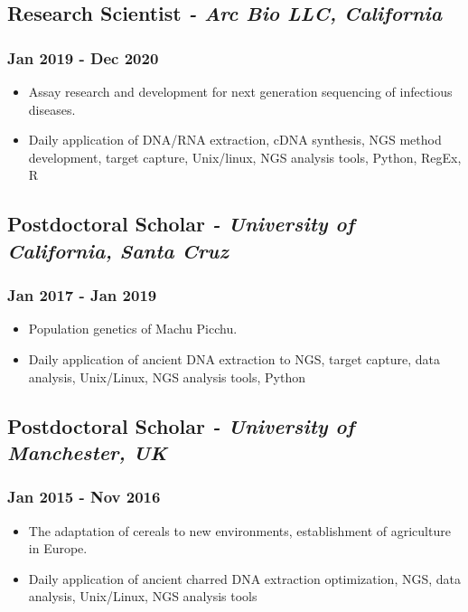 \documentclass[11pt]{article}
\begin{document}
\subsection{Research Scientist \normalfont\textit{- Arc Bio LLC, California}}
\subsubsection{Jan 2019 - Dec 2020}
\begin{itemize}
    \item Assay research and development for next generation sequencing of infectious diseases.
    \item Daily application of DNA/RNA extraction, cDNA synthesis, NGS method development, target capture, Unix/linux, NGS analysis tools, Python, RegEx, R
\end{itemize}
\bigskip

\subsection{Postdoctoral Scholar \normalfont\textit{- University of California, Santa Cruz}}
\subsubsection{Jan 2017 - Jan 2019}
\begin{itemize}
    \item Population genetics of Machu Picchu.
    \item Daily application of ancient DNA extraction to NGS, target capture, data analysis, Unix/Linux, NGS analysis tools, Python
\end{itemize}
\bigskip

\subsection{Postdoctoral Scholar \normalfont\textit{- University of Manchester, UK}}
\subsubsection{Jan 2015 - Nov 2016}
\begin{itemize}
    \item The adaptation of cereals to new environments, establishment of agriculture in Europe.
    \item Daily application of ancient charred DNA extraction optimization, NGS, data analysis, Unix/Linux, NGS analysis tools
\end{itemize}
\end{document}
